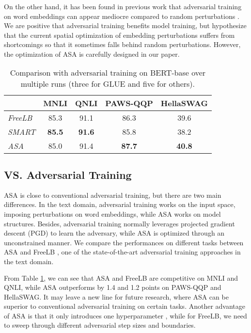 \documentclass[letterpaper]{article} \usepackage{aaai23}  \usepackage{times}  \usepackage{helvet}  \usepackage{courier}  \usepackage[hyphens]{url}  \usepackage{graphicx} \urlstyle{rm} \def\UrlFont{\rm}  \usepackage{natbib}  \usepackage{caption} \frenchspacing  \setlength{\pdfpagewidth}{8.5in}  \setlength{\pdfpageheight}{11in}  \usepackage{algorithm}
\begin{document}
On the other hand, it has been found in previous work that adversarial training on word embeddings can appear mediocre compared to random perturbations \citep{DBLP:conf/iclr/AghajanyanSGGZG21}. We are positive that adversarial training benefits model training, but hypothesize that the current spatial optimization of embedding perturbations suffers from shortcomings so that it sometimes falls behind random perturbations. However, the optimization of ASA is carefully designed in our paper.

\begin{table}
\centering
\small
\begin{tabular}{@{}lcccc@{}}
\toprule
                  & MNLI                     & QNLI                      & PAWS-QQP                     & HellaSWAG \\ \midrule
\textit{FreeLB}   & 85.3          & 91.1           & 86.3              & 39.6 \\
\textit{SMART}    & \textbf{85.5} & \textbf{91.6}  & 85.8              & 38.2 \\
\textit{ASA}      & 85.0          & 91.4           & \textbf{87.7}     & \textbf{40.8} \\ \bottomrule
\end{tabular}
\caption{Comparison with adversarial training on BERT-base over multiple runs (three for GLUE and five for others).}
\label{t6}
\end{table}

\subsection{VS. Adversarial Training}

ASA is close to conventional adversarial training, but there are two main differences. In the text domain, adversarial training works on the input space, imposing perturbations on word embeddings, while ASA works on model structures. Besides, adversarial training normally leverages projected gradient descent (PGD) \citep{DBLP:conf/iclr/MadryMSTV18} to learn the adversary, while ASA is optimized through an unconstrained manner. We compare the performances on different tasks between ASA and FreeLB \citep{DBLP:conf/iclr/ZhuCGSGL20}, one of the state-of-the-art adversarial training approaches in the text domain.

From Table \ref{t6}, we can see that ASA and FreeLB are competitive on MNLI and QNLI, while ASA outperforms by 1.4 and 1.2 points on PAWS-QQP and HellaSWAG. It may leave a new line for future research, where ASA can be superior to conventional adversarial training on certain tasks. Another advantage of ASA is that it only introduces one hyperparameter , while for FreeLB, we need to sweep through different adversarial step sizes and boundaries.
\end{document}
